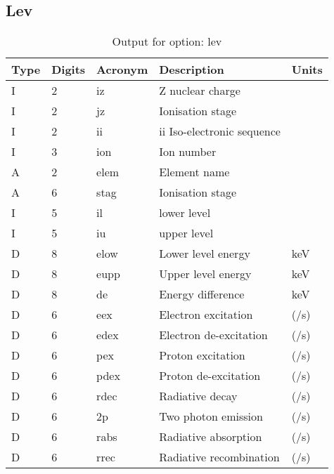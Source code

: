 \subsection{Lev}

\begin{table}[!p]
\caption{Output for option: lev}
\label{tabout:lev}
\begin{tabular}{lllll}
\hline
Type & Digits & Acronym & Description & Units \\ 
\hline
I &  2 & iz   & Z nuclear charge                 &                  \\
I &  2 & jz   & Ionisation stage                 &                  \\
I &  2 & ii   & ii Iso-electronic sequence       &                  \\
I &  3 & ion  & Ion number                       &                  \\
A &  2 & elem & Element name                     &                  \\
A &  6 & stag & Ionisation stage                 &                  \\
I &  5 & il   & lower level                      &                  \\
I &  5 & iu   & upper level                      &                  \\
D &  8 & elow & Lower level energy               & keV              \\
D &  8 & eupp & Upper level energy               & keV              \\
D &  8 & de   & Energy difference                & keV              \\
D &  6 & eex  & Electron excitation              & (/s)             \\
D &  6 & edex & Electron de-excitation           & (/s)             \\
D &  6 & pex  & Proton excitation                & (/s)             \\
D &  6 & pdex & Proton de-excitation             & (/s)             \\
D &  6 & rdec & Radiative decay                  & (/s)             \\
D &  6 & 2p   & Two photon emission              & (/s)             \\
D &  6 & rabs & Radiative absorption             & (/s)             \\
D &  6 & rrec & Radiative recombination          & (/s)             \\

\end{tabular}
\end{table}

